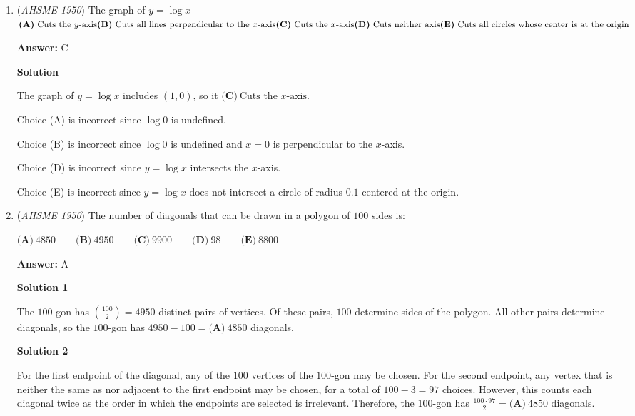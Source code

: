 \begin{enumerate}
	\item (\textit{AHSME 1950}) The graph of $y=\log x$
$\textbf{(A)}\ \text{Cuts the }y\text{-axis}\qquad\\ \textbf{(B)}\ \text{Cuts all lines perpendicular to the }x\text{-axis}\qquad\\ \textbf{(C)}\ \text{Cuts the }x\text{-axis}\qquad\\ \textbf{(D)}\ \text{Cuts neither axis}\qquad\\ \textbf{(E)}\ \text{Cuts all circles whose center is at the origin}$

 \textbf{Answer: }C



\textbf{Solution}

The graph of $y = \log x$ includes $(1, 0)$, so it $\boxed{\textbf{(C)}\ \text{Cuts the }x\text{-axis}}$.

 Choice (A) is incorrect since $\log 0$ is undefined.

 Choice (B) is incorrect since $\log 0$ is undefined and $x = 0$ is perpendicular to the $x$-axis.

 Choice (D) is incorrect since $y = \log x$ intersects the $x$-axis.

 Choice (E) is incorrect since $y = \log x$ does not intersect a circle of radius $0.1$ centered at the origin.

 


	\item (\textit{AHSME 1950}) The number of diagonals that can be drawn in a polygon of $100$ sides is:


 $\textbf{(A)}\ 4850\qquad\textbf{(B)}\ 4950\qquad\textbf{(C)}\ 9900\qquad\textbf{(D)}\ 98\qquad\textbf{(E)}\ 8800$

 \textbf{Answer: }A



\textbf{Solution 1}

The $100$-gon has $\binom{100}{2}=4950$ distinct pairs of vertices. Of these pairs, $100$ determine sides of the polygon.  All other pairs determine diagonals, so the $100$-gon has $4950-100=\boxed{\textbf{(A)}\ 4850 }$ diagonals.

 



\textbf{Solution 2}

For the first endpoint of the diagonal, any of the $100$ vertices of the $100$-gon may be chosen.  For the second endpoint, any vertex that is neither the same as nor adjacent to the first endpoint may be chosen, for a total of $100 - 3 = 97$ choices.  However, this counts each diagonal twice as the order in which the endpoints are selected is irrelevant.  Therefore, the $100$-gon has $\frac{100 \cdot 97}{2} = \boxed{\textbf{(A)}\ 4850}$ diagonals.


\end{enumerate}
